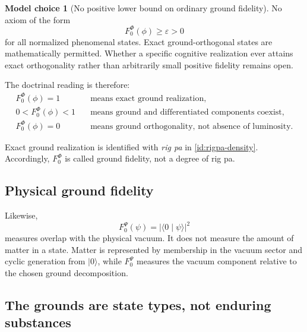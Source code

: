\documentclass[11pt,reqno]{scrartcl}
\newcommand{\ket}[1]{\lvert #1\rangle}
\newcommand{\braket}[2]{\langle #1\mid #2\rangle}
\theoremstyle{plain}
\theoremstyle{definition}
\newtheorem{modelchoice}[modelchoice]{Model choice}
\theoremstyle{remark}
\begin{document}
\begin{modelchoice}[No positive lower bound on ordinary ground fidelity]
\label{choice:no-fidelity-lower-bound}
No axiom of the form
\begin{equation}
  F_0^{\Phi}(\phi)\geq\varepsilon>0
\end{equation}
for all normalized phenomenal states.  Exact ground-orthogonal states are
mathematically permitted.  Whether a specific cognitive realization ever
attains exact orthogonality rather than arbitrarily small positive fidelity
remains open.
\end{modelchoice}

The doctrinal reading is therefore:
\begin{equation}
  \boxed{
  \begin{aligned}
  F_0^{\Phi}(\phi)=1
  &\quad\text{means exact ground realization},\\
  0<F_0^{\Phi}(\phi)<1
  &\quad\text{means ground and differentiated components coexist},\\
  F_0^{\Phi}(\phi)=0
  &\quad\text{means ground orthogonality, not absence of luminosity}.
  \end{aligned}}
  \label{eq:phenomenal-fidelity-reading}
\end{equation}

Exact ground realization is identified with \emph{rig pa} in
\cref{id:rigpa-density}.  Accordingly, $F_0^{\Phi}$ is called ground
fidelity, not a degree of rig pa.

\subsection{Physical ground fidelity}

Likewise,
\begin{equation}
  F_0^{\Psi}(\psi)
  =|\braket{0}{\psi}|^2
\end{equation}
measures overlap with the physical vacuum.  It does not measure the amount of
matter in a state.  Matter is represented by membership in the vacuum sector
and cyclic generation from $\ket0$, while $F_0^{\Psi}$ measures the vacuum
component relative to the chosen ground decomposition.

\subsection{The grounds are state types, not enduring substances}
\end{document}
